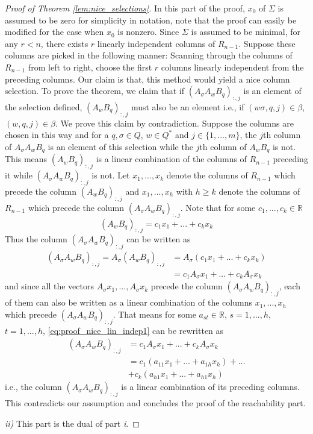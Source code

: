 \documentclass[journal]{IEEEtran}
\begin{document}
\begin{proof}[Proof of Theorem \ref{lem:nice_selections}]
In this part of the proof, $x_0$ of $\Sigma$ is assumed to be zero for simplicity in notation, note that the proof can easily be modified for the case when $x_0$ is nonzero. Since $\Sigma$ is assumed to be minimal, for any $r<n$, there exists $r$ linearly independent columns of $R_{n-1}$. Suppose these columns are picked in the following manner: Scanning through the columns of $R_{n-1}$ from left to right, choose the first $r$ columns linearly independent from the preceding columns. Our claim is that, this method would yield a nice column selection. To prove the theorem, we claim that if $(A_{\sigma}A_wB_q)_{:,j}$ is an element of the selection defined, $(A_wB_q)_{:,j}$ must also be an element i.e., if $(w\sigma,q,j) \in \beta$, $(w,q,j) \in \beta$. We prove this claim by contradiction. Suppose the columns are chosen in this way and for a $q, \sigma \in Q$, $w \in Q^*$ and $j \in \{1,...,m\}$, the $j$th column of $A_\sigma A_wB_q$ is an element of this selection while the $j$th column of $A_wB_q$ is not. This means $(A_wB_q)_{:,j}$ is a linear combination of the columns of $R_{n-1}$ preceding it while $(A_\sigma A_wB_q)_{:,j}$ is not. Let $x_1,...,x_k$ denote the columns of $R_{n-1}$ which precede the column $(A_wB_q)_{:,j}$ and $x_1,...,x_h$ with $h \geq k$ denote the columns of $R_{n-1}$ which precede the column $(A_\sigma A_wB_q)_{:,j}$. Note that for some $c_1,...,c_k \in \mathbb{R}$
\[
(A_wB_q)_{:,j}=c_1x_1+...+c_kx_k
\]
Thus the column $(A_\sigma A_wB_q)_{:,j}$ can be written as
\begin{equation} \label{eq:proof_nice_lin_indep1}
\begin{aligned}
(A_\sigma A_wB_q)_{:,j}=A_\sigma(A_wB_q)_{:,j} & =A_\sigma(c_1x_1+...+c_kx_k) \\ 
& =c_1A_\sigma x_1+...+c_kA_\sigma x_k
\end{aligned}
\end{equation}
and since all the vectors $A_\sigma x_1,...,A_\sigma x_k$ precede the column $(A_\sigma A_wB_q)_{:,j}$, each of them can also be written as a linear combination of the columns $x_1,...,x_h$ which precede $(A_\sigma A_wB_q)_{:,j}$. That means for some $a_{st} \in \mathbb{R}$, $s=1,...,h$, $t=1,...,h$, \eqref{eq:proof_nice_lin_indep1} can be rewritten as
\begin{equation*}
\begin{aligned}
(A_\sigma A_wB_q)_{:,j} & = c_1A_\sigma x_1+...+c_kA_\sigma x_k \\
& =c_1(a_{11}x_1+...+a_{1h}x_h)+... \\
& +c_k(a_{h1}x_1+...+a_{h1}x_h)
\end{aligned}
\end{equation*}
i.e., the column $(A_\sigma A_wB_q)_{:,j}$ is a linear combination of its preceding columns. This contradicts our assumption and concludes the proof of the reachability part.

\emph{ii)} This part is the dual of part \emph{i}.
\end{proof}











\ifCLASSOPTIONcaptionsoff
  \newpage
\fi











\end{document}
